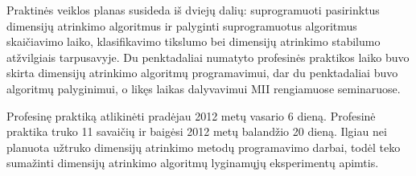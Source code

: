 Praktinės veiklos planas susideda iš dviejų dalių: suprogramuoti pasirinktus 
dimensijų atrinkimo algoritmus ir palyginti suprogramuotus algoritmus 
skaičiavimo laiko, klasifikavimo tikslumo bei dimensijų atrinkimo stabilumo 
atžvilgiais tarpusavyje. Du penktadaliai numatyto profesinės praktikos laiko 
buvo skirta dimensijų atrinkimo algoritmų programavimui, dar du penktadaliai 
buvo algoritmų palyginimui, o likęs laikas dalyvavimui MII rengiamuose 
seminaruose.

Profesinę praktiką atlikinėti pradėjau 2012 metų vasario 6 dieną. Profesinė 
praktika truko 11 savaičių ir baigėsi 2012 metų balandžio 20 dieną. Ilgiau nei 
planuota užtruko dimensijų atrinkimo metodų programavimo darbai, todėl teko
sumažinti dimensijų atrinkimo algoritmų lyginamųjų eksperimentų apimtis.

